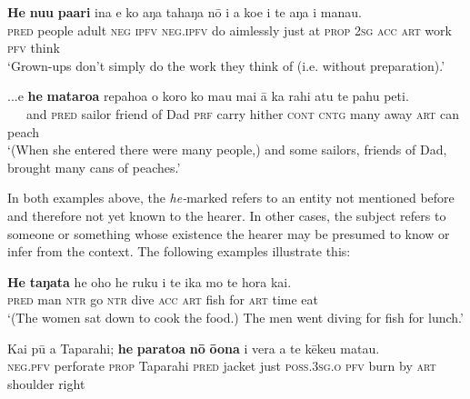 \ea\label{ex:8.91}
\gll \textbf{He} \textbf{nu{\ꞌ}u} \textbf{pa{\ꞌ}ari} {\ꞌ}ina e ko aŋa tahaŋa nō i a koe  i te aŋa i mana{\ꞌ}u.\\
\textsc{pred} people adult \textsc{neg} \textsc{ipfv} \textsc{neg.ipfv} do aimlessly just at \textsc{prop} \textsc{2sg}  \textsc{acc} \textsc{art} work \textsc{pfv} think\\

\glt 
‘Grown-ups don’t simply do{\rmfnm} the work they think of (i.e. without preparation).’ \textstyleExampleref{[R363.145]} 
\z
{}

\ea\label{ex:8.92}
\gll ...{\ꞌ}e \textbf{he} \textbf{mataroa} repahoa o koro ko ma{\ꞌ}u mai {\ꞌ}ā ka rahi atu  te pahu peti.\\
~~~and \textsc{pred} sailor friend of Dad \textsc{prf} carry hither \textsc{cont} \textsc{cntg} many away  \textsc{art} can peach\\

\glt
‘(When she entered there were many people,) and some sailors, friends of Dad, brought many cans of peaches.’ \textstyleExampleref{[R210.125]}
\z

In both examples above, the \textit{he-}marked  refers to an entity not mentioned before and therefore not yet known to the hearer. In other cases, the subject refers to someone or something whose existence the hearer may be presumed to know or infer from the context. The following examples illustrate this:

\ea\label{ex:8.93}
\gll \textbf{He} \textbf{taŋata} he oho he ruku i te ika mo te hora kai. \\
\textsc{pred} man \textsc{ntr} go \textsc{ntr} dive \textsc{acc} \textsc{art} fish for \textsc{art} time eat \\

\glt 
‘(The women sat down to cook the food.) The men went diving for fish for lunch.’ \textstyleExampleref{[R183.019]} 
\z

\ea\label{ex:8.94}
\gll Kai pū a Taparahi; \textbf{he} \textbf{paratoa} \textbf{nō} \textbf{ō{\ꞌ}ona} i vera a te kēke{\ꞌ}u mata{\ꞌ}u.\\
\textsc{neg.pfv} perforate \textsc{prop} Taparahi \textsc{pred} jacket just \textsc{poss.3sg.o} \textsc{pfv} burn by \textsc{art} shoulder right\\

